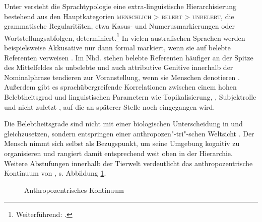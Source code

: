 Unter  versteht die Sprachtypologie eine extra-linguistische Hierarchisierung  bestehend aus den Hauptkategorien \textsc{menschlich > belebt > unbelebt}, die grammatische Regularitäten, etwa  Kasus- und Numerusmarkierungen  oder  Wortstellungsabfolgen, determiniert.\footnote{Weiterführend:  \cite{Silverstein1976,Allan1987,Comrie1989,Langacker1991,Dahl1996,Yamamoto1999,Yamamoto2006,Croft1995,Croft2006,Dixon1995, Corbett2000,Aissen2003,Zifonun2006, Dahl2008}.} In vielen australischen Sprachen werden beispielsweise Akkusative  nur dann formal markiert, wenn sie auf belebte  Referenten verweisen \parencite[189]{Comrie1989}. 
Im Nhd. stehen belebte  Referenten häufiger an der Spitze des Mittelfeldes  als unbelebte  \parencite{Kempen2004} und auch attributive Genitive  innerhalb der Nominalphrase  tendieren zur  Voranstellung, wenn sie Menschen denotieren  \parencite{Hartmann2003}. Außerdem gibt es sprachübergreifende Korrelationen zwischen einem hohen Belebtheitsgrad  und linguistischen Parametern wie    Topikalisierung, , Subjektrolle  und nicht zuletzt  \parencite{Comrie1989, Yamamoto2006}, auf die an späterer Stelle noch eingegangen wird. 

Die Belebtheitsgrade  sind nicht mit einer biologischen Unterscheidung in  und  gleichzusetzen, sondern entspringen einer anthropozen"-tri"-schen Weltsicht \parencite[s.][]{Fraurud1996,Yamamoto1999,Enger2011}. Der Mensch nimmt sich selbst als Bezugspunkt, um seine Umgebung kognitiv zu organisieren und rangiert damit entsprechend weit oben in der  Hierarchie. Weitere Abstufungen innerhalb der Tierwelt verdeutlicht das anthropozentrische Kontinuum von \textcite[114--115]{Kopcke2000}, s. Abbildung \ref{anthro}. 

\begin{figure}
{\small{}}
\caption {Anthropozentrisches Kontinuum \parencite[115]{Kopcke2000}}
\label{anthro}
\end{figure} 

